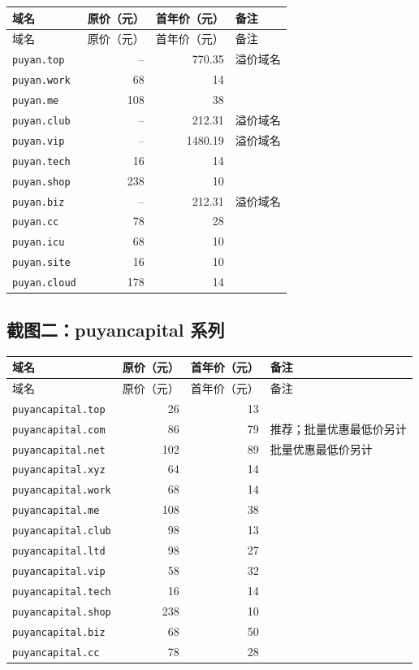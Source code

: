 \documentclass[11pt,a4paper]{ctexart}
\begin{document}
\begin{longtable}{@{}lrrl@{}}
\toprule
域名 & 原价（元） & 首年价（元） & 备注 \\
\midrule
\endfirsthead
\toprule
域名 & 原价（元） & 首年价（元） & 备注 \\
\midrule
\endhead
\texttt{puyan.top}   & --  & 770.35  & 溢价域名 \\
\texttt{puyan.work}  & 68  & 14      & \\
\texttt{puyan.me}    & 108 & 38      & \\
\texttt{puyan.club}  & --  & 212.31  & 溢价域名 \\
\texttt{puyan.vip}   & --  & 1480.19 & 溢价域名 \\
\texttt{puyan.tech}  & 16  & 14      & \\
\texttt{puyan.shop}  & 238 & 10      & \\
\texttt{puyan.biz}   & --  & 212.31  & 溢价域名 \\
\texttt{puyan.cc}    & 78  & 28      & \\
\texttt{puyan.icu}   & 68  & 10      & \\
\texttt{puyan.site}  & 16  & 10      & \\
\texttt{puyan.cloud} & 178 & 14      & \\
\bottomrule
\end{longtable}

\subsection*{截图二：puyancapital 系列}

\begin{longtable}{@{}lrrl@{}}
\toprule
域名 & 原价（元） & 首年价（元） & 备注 \\
\midrule
\endfirsthead
\toprule
域名 & 原价（元） & 首年价（元） & 备注 \\
\midrule
\endhead
\texttt{puyancapital.top}  & 26  & 13 & \\
\texttt{puyancapital.com}  & 86  & 79 & 推荐；批量优惠最低价另计 \\
\texttt{puyancapital.net}  & 102 & 89 & 批量优惠最低价另计 \\
\texttt{puyancapital.xyz}  & 64  & 14 & \\
\texttt{puyancapital.work} & 68  & 14 & \\
\texttt{puyancapital.me}   & 108 & 38 & \\
\texttt{puyancapital.club} & 98  & 13 & \\
\texttt{puyancapital.ltd}  & 98  & 27 & \\
\texttt{puyancapital.vip}  & 58  & 32 & \\
\texttt{puyancapital.tech} & 16  & 14 & \\
\texttt{puyancapital.shop} & 238 & 10 & \\
\texttt{puyancapital.biz}  & 68  & 50 & \\
\texttt{puyancapital.cc}   & 78  & 28 & \\
\bottomrule
\end{longtable}
\end{document}
